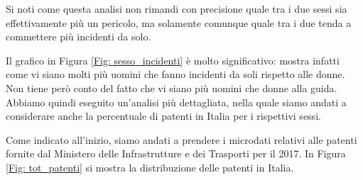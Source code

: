 \documentclass[12pt,a4paper,final,oneside]{article}			%
\begin{document}
        Si noti come questa analisi non rimandi con precisione quale tra i due sessi sia effettivamente più un pericolo, ma solamente comunque quale tra i due tenda a commettere più incidenti da solo.
        
        Il grafico in Figura \ref{Fig: sesso_incidenti} è molto significativo: mostra infatti come vi siano molti più uomini che fanno incidenti da soli rispetto alle donne. Non tiene però conto del fatto che vi siano più uomini che donne alla guida. Abbiamo quindi eseguito un'analisi più dettagliata, nella quale siamo andati a considerare anche la percentuale di patenti in Italia per i rispettivi sessi.
        
        
        
        Come indicato all'inizio, siamo andati a prendere i microdati relativi alle patenti fornite dal Ministero delle Infrastrutture e dei Trasporti per il 2017. In Figura \ref{Fig: tot_patenti} si mostra la distribuzione delle patenti in Italia.
\end{document}
